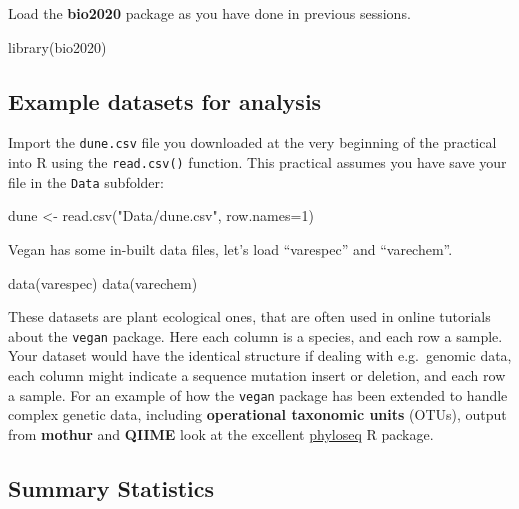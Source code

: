 \documentclass[
]{article}
\newenvironment{Shaded}{\begin{snugshade}}{\end{snugshade}}
\newcommand{\AttributeTok}[1]{\textcolor[rgb]{0.77,0.63,0.00}{#1}}
\newcommand{\DecValTok}[1]{\textcolor[rgb]{0.00,0.00,0.81}{#1}}
\newcommand{\FunctionTok}[1]{\textcolor[rgb]{0.00,0.00,0.00}{#1}}
\newcommand{\NormalTok}[1]{#1}
\newcommand{\OtherTok}[1]{\textcolor[rgb]{0.56,0.35,0.01}{#1}}
\newcommand{\StringTok}[1]{\textcolor[rgb]{0.31,0.60,0.02}{#1}}
\begin{document}
Load the \textbf{bio2020} package as you have done in previous sessions.

\begin{Shaded}
\begin{Highlighting}[]
\FunctionTok{library}\NormalTok{(bio2020)}
\end{Highlighting}
\end{Shaded}

\hypertarget{example-datasets-for-analysis}{%
\subsection{Example datasets for
analysis}\label{example-datasets-for-analysis}}

Import the \texttt{dune.csv} file you downloaded at the very beginning
of the practical into R using the \texttt{read.csv()} function. This
practical assumes you have save your file in the \texttt{Data}
subfolder:

\begin{Shaded}
\begin{Highlighting}[]
\NormalTok{dune }\OtherTok{\textless{}{-}} \FunctionTok{read.csv}\NormalTok{(}\StringTok{"Data/dune.csv"}\NormalTok{, }\AttributeTok{row.names=}\DecValTok{1}\NormalTok{)}
\end{Highlighting}
\end{Shaded}

Vegan has some in-built data files, let's load ``varespec'' and
``varechem''.

\begin{Shaded}
\begin{Highlighting}[]
\FunctionTok{data}\NormalTok{(varespec)}
\FunctionTok{data}\NormalTok{(varechem)}
\end{Highlighting}
\end{Shaded}

These datasets are plant ecological ones, that are often used in online
tutorials about the \texttt{vegan} package. Here each column is a
species, and each row a sample. Your dataset would have the identical
structure if dealing with e.g.~genomic data, each column might indicate
a sequence mutation insert or deletion, and each row a sample. For an
example of how the \texttt{vegan} package has been extended to handle
complex genetic data, including \textbf{operational taxonomic units}
(OTUs), output from \textbf{mothur} and \textbf{QIIME} look at the
excellent \href{https://joey711.github.io/phyloseq/}{phyloseq} R
package.

\hypertarget{summary-statistics}{%
\subsection{Summary Statistics}\label{summary-statistics}}
\end{document}
